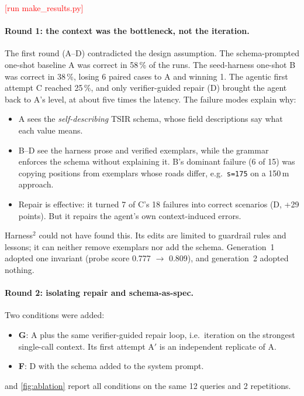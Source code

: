 \documentclass[10pt,a4paper]{article}
\newcommand{\todo}[1]{\textcolor{red}{[#1]}}
\newcommand{\ResultsAblation}{\todo{run make\_results.py}}}
\providecommand{\ResultsAblation}{\todo{ablation pending}}
\begin{document}
\ResultsAblation

\paragraph{Round 1: the context was the bottleneck, not the iteration.} The first round (A--D) contradicted
the design assumption. The schema-prompted one-shot baseline A was correct in 58\,\% of the runs.
The seed-harness one-shot B was correct in 38\,\%, losing 6 paired cases to A and winning 1. The agentic
first attempt C reached 25\,\%, and only verifier-guided repair (D) brought the agent back to A's level, at
about five times the latency. The failure modes explain why:
\begin{itemize}[leftmargin=1.4em,itemsep=0pt]
\item A sees the \emph{self-describing} TSIR schema, whose field descriptions say what each value means.
\item B--D see the harness prose and verified exemplars, while the grammar enforces the schema without
  explaining it. B's dominant failure (6 of 15) was copying positions from exemplars whose roads differ, e.g.\
  \texttt{s=175} on a 150\,m approach.
\item Repair is effective: it turned 7 of C's 18 failures into correct scenarios (D, +29 points). But it
  repairs the agent's own context-induced errors.
\end{itemize}
Harness$^2$ could not have found this. Its edits are limited to guardrail rules and lessons; it can neither
remove exemplars nor add the schema. Generation~1 adopted one invariant (probe score 0.777 $\to$ 0.809), and
generation~2 adopted nothing.

\paragraph{Round 2: isolating repair and schema-as-spec.} Two conditions were added:
\begin{itemize}[leftmargin=1.4em,itemsep=0pt]
\item \textbf{G}: A plus the same verifier-guided repair loop, i.e.\ iteration on the strongest single-call
  context. Its first attempt A$'$ is an independent replicate of A.
\item \textbf{F}: D with the schema added to the system prompt.
\end{itemize}
 and \cref{fig:ablation} report all conditions on the same 12 queries and 2 repetitions.
\end{document}
